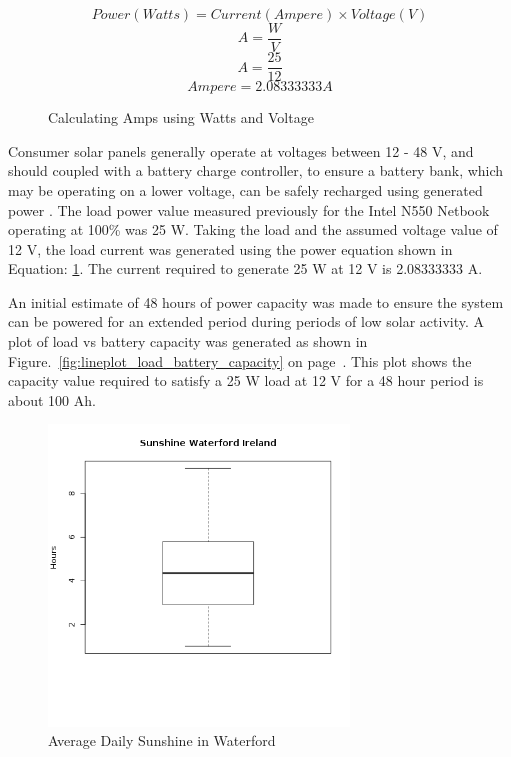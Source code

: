 %
\begin{figure}[here]
	\centering
	\begin{equation}
	Power(Watts) = Current(Ampere) \times Voltage(V)
	\end{equation}
	\begin{equation}
	A = \frac{W}{V}
	\end{equation}
	\begin{equation}
	A = \frac{25}{12}
	\end{equation}
	\begin{equation}
	Ampere = 2.08333333 A
	\end{equation}
	\caption{Calculating Amps using Watts and Voltage}
	\label{fig:power_equation}
\end{figure}
%

Consumer solar panels generally operate at voltages between 12 - 48 V, and should coupled with a battery charge controller, to ensure a battery bank, which may be operating on a lower voltage, can be safely recharged using generated power \citep{bryce-11}. The load power value measured previously for the Intel N550 Netbook operating at 100\% was 25 W. Taking the load and the assumed voltage value of 12 V, the load current was generated using the power equation shown in Equation: \ref{fig:power_equation}. The current required to generate 25 W at 12 V is 2.08333333 A.

An initial estimate of 48 hours of power capacity was made to ensure the system can be powered for an extended period during periods of low solar activity. A plot of load vs battery capacity was generated as shown in Figure.~\ref{fig:lineplot_load_battery_capacity} on page~\pageref{fig:lineplot_load_battery_capacity}. This plot shows the capacity value required to satisfy a 25 W load at 12 V for a 48 hour period is about 100 Ah.

%
\begin{figure}[!htb]
	\centering
	\includegraphics[width=8cm]{images/62}
	\caption{Average Daily Sunshine in Waterford}
	\label{fig:boxplot_hours_sunshine_waterford}
\end{figure}
%

